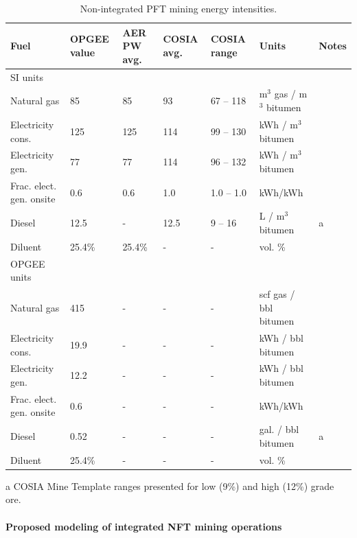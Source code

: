 \documentclass[11pt]{report}
\begin{document}
\begin{table}
\caption{Non-integrated PFT mining energy intensities.}
\label{tab:mining_nonint_energy}
\begin{scriptsize}
\begin{tabularx}{1\columnwidth}{p{}p{}p{}p{}p{} p{}p{}}
\toprule
Fuel & OPGEE value & AER PW avg. & COSIA avg. & COSIA range & Units &  Notes\\
\midrule
SI units 			&	& 	&	&			& &  \\
\midrule
Natural gas 		& 85 		& 85 		& 93 		& 67 -- 118		& m$^3$ gas / m$^3$ bitumen& \\
Electricity	cons.	& 125	& 125	& 114	& 99 -- 130		& kWh / m$^3$ bitumen &\\
Electricity gen.		& 77		& 77		& 114	& 96 -- 132		& kWh / m$^3$ bitumen  &\\
Frac. elect. gen. onsite	& 0.6 & 0.6	& 1.0		& 1.0 -- 1.0		& kWh/kWh & \\
Diesel			& 12.5	& -		& 12.5	& 9 -- 16			& L / m$^3$ bitumen & a \\	
Diluent			& 25.4\%	& 25.4\%	& -		& -				& vol. \% & \\
\midrule
OPGEE units 			&	& 	&	&			& &  \\
\midrule
Natural gas 		& 415		& -	& -		& -		& scf gas / bbl bitumen& \\
Electricity	cons.	& 19.9	& -	& -	& -		& kWh / bbl bitumen &\\
Electricity gen.		& 12.2		& -		& -	& -		& kWh / bbl bitumen  &\\
Frac. elect. gen. onsite	& 0.6 & -	& -		& -		& kWh/kWh & \\
Diesel			& 0.52 	& -		& -	& -			& gal. / bbl bitumen & a \\	
Diluent			& 25.4\%	& -	& -		& -				& vol. \% & \\
\bottomrule
\end{tabularx}
\begin{tablenotes}
\item[a] COSIA Mine Template ranges presented for low (9\%) and high (12\%) grade ore.
\end{tablenotes}
\end{scriptsize}
\end{table}

\paragraph{Proposed modeling of integrated NFT mining operations}
\end{document}
